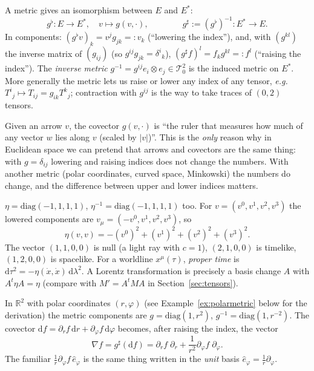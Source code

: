 \documentclass[11pt,a4paper]{article}
\numberwithin{equation}{section}
\theoremstyle{definition}
\theoremstyle{plain}
\newcommand{\R}{\mathbb{R}}
\newcommand{\dd}{\mathrm{d}}
\newcommand{\TT}[2]{\mathcal{T}^{#1}_{#2}}          %
\newcommand{\eg}{\emph{e.g.}\ }
\begin{document}
\begin{formal}
A metric gives an isomorphism between $E$ and $E^*$:
\[
g^\flat:E\to E^*,\quad v\mapsto g(v,\cdot),\qquad\qquad g^\sharp:=(g^\flat)^{-1}:E^*\to E.
\]
In components: $(g^\flat v)_k=v^jg_{jk}=:v_k$ (``lowering the index''), and, with $(g^{kl})$ the inverse matrix of $(g_{ij})$ (so $g^{ij}g_{jk}=\delta^i{}_k$), $(g^\sharp f)^l=f_kg^{kl}=:f^l$ (``raising the index''). The \emph{inverse metric} $g^{-1}=g^{ij}e_i\otimes e_j\in\TT{2}{0}$ is the induced metric on $E^*$. More generally the metric lets us raise or lower any index of any tensor, \eg $T^i{}_j\mapsto T_{ij}=g_{ik}T^k{}_j$; contraction with $g^{ij}$ is the way to take traces of $(0,2)$ tensors.
\end{formal}

\begin{intuition}
Given an arrow $v$, the covector $g(v,\cdot)$ is ``the ruler that measures how much of any vector $w$ lies along $v$ (scaled by $|v|$)''. This is the \emph{only} reason why in Euclidean space we can pretend that arrows and covectors are the same thing: with $g=\delta_{ij}$ lowering and raising indices does not change the numbers. With another metric (polar coordinates, curved space, Minkowski) the numbers do change, and the difference between upper and lower indices matters.
\end{intuition}

\begin{example}
$\eta=\mathrm{diag}(-1,1,1,1)$, $\eta^{-1}=\mathrm{diag}(-1,1,1,1)$ too. For $v=(v^0,v^1,v^2,v^3)$ the lowered components are $v_\mu=(-v^0,v^1,v^2,v^3)$, so
\[
\eta(v,v)=-(v^0)^2+(v^1)^2+(v^2)^2+(v^3)^2.
\]
The vector $(1,1,0,0)$ is null (a light ray with $c=1$), $(2,1,0,0)$ is timelike, $(1,2,0,0)$ is spacelike. For a worldline $x^\mu(\tau)$, \emph{proper time} is $\dd\tau^2=-\eta(\dot x,\dot x)\,\dd\lambda^2$. A Lorentz transformation is precisely a basis change $A$ with $A^t\eta A=\eta$ (compare with $M'=A^tMA$ in Section~\ref{sec:tensors}).
\end{example}

\begin{example}
In $\R^2$ with polar coordinates $(r,\varphi)$ (see Example~\ref{ex:polarmetric} below for the derivation) the metric components are $g=\mathrm{diag}(1,r^2)$, $g^{-1}=\mathrm{diag}(1,r^{-2})$. The covector $\dd f=\partial_rf\,\dd r+\partial_\varphi f\,\dd\varphi$ becomes, after raising the index, the vector
\[
\nabla f=g^\sharp(\dd f)=\partial_rf\;\partial_r+\frac{1}{r^2}\partial_\varphi f\;\partial_\varphi .
\]
The familiar $\frac1r\partial_\varphi f\,\hat e_\varphi$ is the same thing written in the \emph{unit} basis $\hat e_\varphi=\frac1r\partial_\varphi$.
\end{example}
\end{document}
